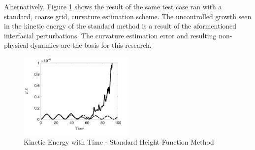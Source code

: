 Alternatively, Figure \ref{fig:stdKE} shows the result of the same test case ran with a standard, coarse grid, curvature estimation scheme. The uncontrolled growth seen in the kinetic energy of the standard method is a result of the aformentioned interfacial perturbations. The curvature estimation error and resulting non-physical dynamics are the basis for this research. 
\begin{figure}[h]
	\centering
	\includegraphics[width=0.5\textwidth]{figs/stdHt_KEplot.png}
	\caption{Kinetic Energy with Time - Standard Height Function Method}
	\label{fig:stdKE}
\end{figure}